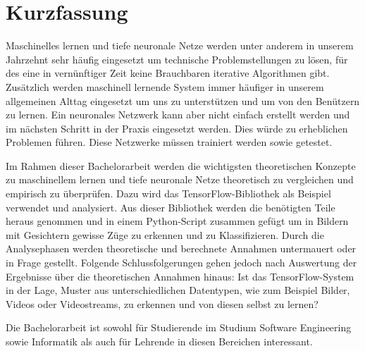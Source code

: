 
\chapter{Kurzfassung}

Maschinelles lernen und tiefe neuronale Netze werden unter anderem in 
unserem Jahrzehnt sehr häufig eingesetzt um technische Problemstellungen 
zu lösen, für des eine in vernünftiger Zeit keine Brauchbaren 
iterative Algorithmen gibt. Zusätzlich werden maschinell 
lernende System immer häufiger in unserem allgemeinen Alttag 
eingesetzt um uns zu unterstützen und um von den Benützern zu lernen.
Ein neuronales Netzwerk kann aber nicht einfach erstellt werden
und im nächsten Schritt in der Praxis eingesetzt werden. Dies würde 
zu erheblichen Problemen führen. Diese Netzwerke müssen trainiert werden
sowie getestet. 


Im Rahmen dieser Bachelorarbeit werden die wichtigsten theoretischen Konzepte zu 
maschinellem lernen und tiefe neuronale Netze theoretisch zu vergleichen und empirisch zu überprüfen. 
Dazu wird das TensorFlow-Bibliothek als Beispiel verwendet und analysiert. Aus dieser Bibliothek werden 
die benötigten Teile heraus genommen und in einem Python-Script zusammen gefügt um in Bildern mit Gesichtern 
gewisse Züge zu erkennen und zu Klassifizieren. Durch die Analysephasen werden theoretische und berechnete Annahmen 
untermauert oder in Frage gestellt. Folgende Schlussfolgerungen gehen jedoch nach Auswertung 
der Ergebnisse über die theoretischen Annahmen hinaus: Ist das TensorFlow-System 
in der Lage, Muster aus unterschiedlichen Datentypen, wie zum Beispiel Bilder, 
Videos oder Videostreams, zu erkennen und von diesen selbst zu lernen?

Die Bachelorarbeit ist sowohl für Studierende im Studium Software Engineering sowie 
Informatik als auch für Lehrende in diesen Bereichen interessant.




